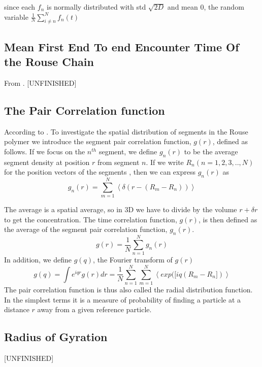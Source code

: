 \documentclass{report}
\begin{document}
since each $f_n$ is normally distributed with std $\sqrt{2D}$ and mean 0, the random variable $\frac{1}{N}\sum_{i\neq n}^Nf_n(t)$ 


\subsection{Mean First End To end Encounter Time Of the Rouse Chain}\label{subsection_meanEndToEndEncounterTimeOfTheRouseChain}
From \cite{amitai2012computation}. [UNFINISHED]

\subsection{The Pair Correlation function}\label{subsection_thePairCorrelationFunction}
According to \cite{doi1996introduction}. To investigate the spatial distribution of segments in the Rouse polymer we introduce the segment pair correlation function, $g(r)$, defined as follows. If we focus on the $n^{th}$ segment, we define $g_n(r)$ to be the average segment density at position $r$ from segment $n$. If we write $R_n(n=1,2,3,..,N)$ for the position vectors of the segments , then we can express $g_n(r)$ as 
\begin{equation*}
g_n(r)=\sum_{m=1}^N \left<\delta(r-(R_m-R_n)) \right>
\end{equation*} 

The average is a spatial average, so in 3D we have to divide by the volume $r+\delta r$ to get the concentration. The time correlation function, $g(r)$, is then defined as the average of the segment pair correlation function, $g_n(r)$. 
\begin{equation*}
g(r) = \frac{1}{N}\sum_{n=1}^{N}g_n(r)
\end{equation*}
In addition, we define $g(q)$, the Fourier transform of $g(r)$
\begin{equation*}
g(q) = \int e^{iqr}g(r)dr = \frac{1}{N}\sum\limits_{n=1}^{N}\sum\limits_{m=1}^{N}\left<exp([iq(R_m-R_n]) \right>
\end{equation*}
The pair correlation function is thus also called the radial distribution function. In the simplest terms it is a measure of probability of finding a particle at a distance $r$ away from a given reference particle. 


\subsection{Radius of Gyration}\label{subsection_radiusOfGyration}
[UNFINISHED]
\end{document}
